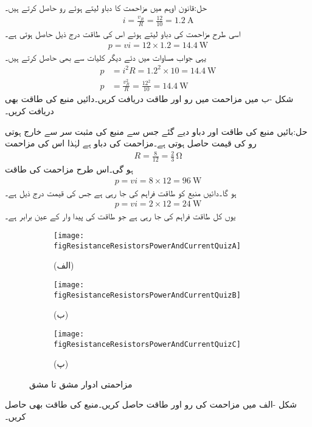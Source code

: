 حل:قانون اوہم میں مزاحمت کا دباو  لیتے ہوئے رو حاصل کرتے ہیں۔
\begin{align*}
i=\frac{v_R}{R}=\frac{12}{10}=\SI{1.2}{\ampere}
\end{align*}
اسی طرح مزاحمت کی دباو  لیتے ہوئے اس کی طاقت درج ذیل حاصل ہوتی ہے۔
\begin{align*}
p=v i =12 \times 1.2=\SI{14.4}{\watt}
\end{align*}
یہی جواب مساوات  میں دئے دیگر کلیات سے بھی حاصل کرتے ہیں۔
\begin{align*}
p&=i^2 R=1.2^2\times 10=\SI{14.4}{\watt}\\
p&=\frac{v_R^2}{R}=\frac{12^2}{10}=\SI{14.4}{\watt}
\end{align*}
شکل -ب میں مزاحمت میں رو اور طاقت دریافت کریں۔دائیں منبع کی طاقت بھی دریافت کریں۔

حل:بائیں منبع کی طاقت اور دباو دیے گئے جس سے منبع کی مثبت سر سے خارج ہوتی رو کی قیمت  حاصل ہوتی ہے۔مزاحمت کی دباو  ہے  لہٰذا اس کی مزاحمت
\begin{align*}
R=\frac{8}{12}=\frac{2}{3} \, \si{\ohm}
\end{align*}
ہو گی۔اس طرح مزاحمت کی طاقت
\begin{align*}
p=v i=8 \times 12=\SI{96}{\watt}
\end{align*}
ہو گا۔دائیں منبع کو طاقت فراہم کی جا رہی ہے جس کی قیمت درج ذیل ہے۔
\begin{align*}
p=v i =2 \times 12=\SI{24}{\watt}
\end{align*}
یوں کل  طاقت فراہم کی جا رہی ہے جو طاقت کی پیدا وار کے عین برابر ہے۔
\FloatBarrier

\begin{figure}
\centering
\begin{subfigure}{0.33\textwidth}
\texttt{[image: figResistanceResistorsPowerAndCurrentQuizA]}
\caption*{(الف)}
\end{subfigure}%
%
\begin{subfigure}{0.33\textwidth}
\texttt{[image: figResistanceResistorsPowerAndCurrentQuizB]}
\caption*{(ب)}
\end{subfigure}%
\begin{subfigure}{0.33\textwidth}
\texttt{[image: figResistanceResistorsPowerAndCurrentQuizC]}
\caption*{(پ)}
\end{subfigure}%
\caption{مزاحمتی ادوار مشق  تا مشق }
\label{شکل_مزاحمتی_اکلوتا_مزاحمت_طاقت_رو_مشق}
\end{figure}
شکل -الف میں مزاحمت کی رو اور طاقت حاصل کریں۔منبع کی طاقت بھی حاصل کریں۔

